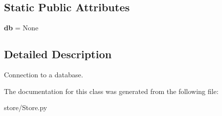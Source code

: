 \subsection*{Static Public Attributes}
\begin{DoxyCompactItemize}
\item 
\hypertarget{classstore_1_1_store_1_1_couchbase_store_aa5b16666e07642f870d64fcd72e17304}{{\bfseries db} = None}\label{classstore_1_1_store_1_1_couchbase_store_aa5b16666e07642f870d64fcd72e17304}

\end{DoxyCompactItemize}


\subsection{Detailed Description}
Connection to a database. 

The documentation for this class was generated from the following file\-:\begin{DoxyCompactItemize}
\item 
store/Store.\-py\end{DoxyCompactItemize}
